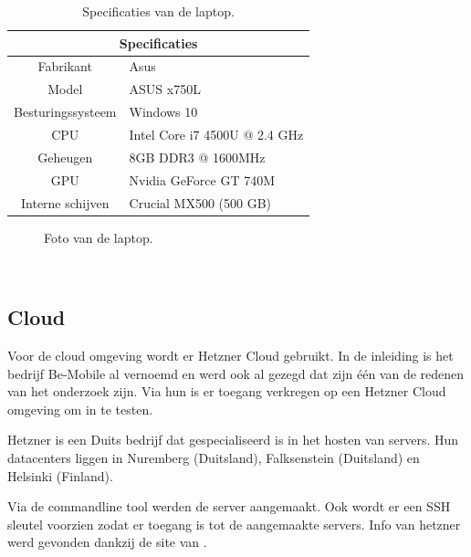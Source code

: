 \begin{table}
	\centering
	\begin{tabular}{c l}
		\hline
		\multicolumn{2}{c}{\textbf{Specificaties}} \\
		\hline
		Fabrikant & Asus \\
		\hline
		Model & ASUS x750L \\
		\hline		
        Besturingssysteem & Windows 10\\
        \hline
		CPU & Intel Core i7 4500U @ 2.4 GHz  \\
		\hline
		Geheugen & 8GB DDR3 @ 1600MHz \\
		\hline
		GPU & Nvidia GeForce GT 740M \\
		\hline
		Interne schijven & Crucial MX500 (500 GB) \\
		\hline
	\end{tabular}
	\caption{Specificaties van de laptop.}
	\label{tab:specs_desktop }
\end{table}

\begin{figure}[!htb]
	\caption{Foto van de laptop.}
	\label{fig:asustest}
\end{figure}

\
\subsection{Cloud}
Voor de cloud omgeving wordt er Hetzner Cloud gebruikt. In de inleiding is het bedrijf Be-Mobile al vernoemd en werd ook al gezegd dat zijn één van de redenen van het onderzoek zijn. Via hun is er toegang verkregen op een Hetzner Cloud omgeving om in te testen. 

Hetzner is een Duits bedrijf dat gespecialiseerd is in het hosten van servers. Hun datacenters liggen in Nuremberg (Duitsland), Falksenstein (Duitsland) en Helsinki (Finland). 

Via de commandline tool werden de server aangemaakt. Ook wordt er een SSH sleutel voorzien zodat er toegang is tot de aangemaakte servers. Info van hetzner werd gevonden dankzij de site van \autocite{hetzner}.


